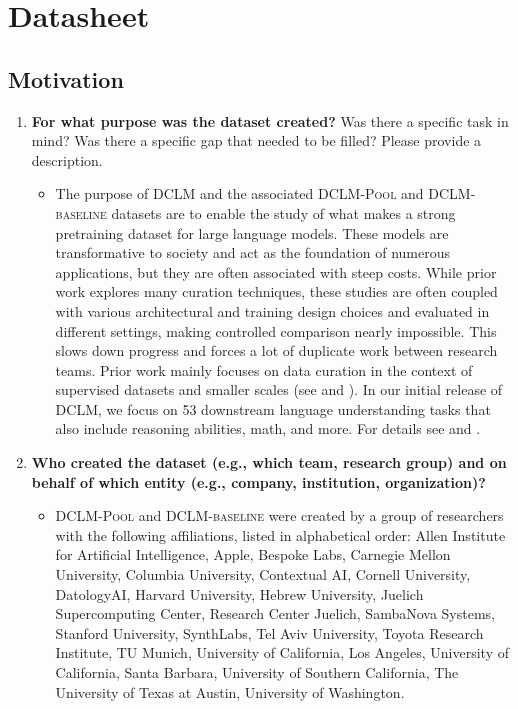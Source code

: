 \documentclass{article}
\newcommand{\dclm}{\textsc{DCLM}\xspace}
\newcommand{\rawpool}{\textsc{DCLM-Pool}\xspace}
\newcommand{\hqpool}{\textsc{DCLM-baseline}\xspace}
\begin{document}
\section{Datasheet}\label{appx:datasheet}

\subsection{Motivation}

\begin{enumerate}[label=Q\arabic*]

\item \textbf{For what purpose was the dataset created?} Was there a specific task in mind? Was there a specific gap that needed to be filled? Please provide a description.

\begin{itemize}
\item The purpose of \dclm and the associated \rawpool and \hqpool datasets are to enable the study of what makes a strong pretraining dataset for large language models. These models are transformative to society and act as the foundation of numerous applications, but they are often associated with steep costs.
While prior work explores many curation techniques, these studies are often coupled with various architectural and training design choices and evaluated in different settings, making controlled comparison nearly impossible.
This slows down progress and forces a lot of duplicate work between research teams. Prior work mainly focuses on data curation in the context of supervised datasets and smaller scales (see  and ).
In our initial release of \dclm, we focus on 53 downstream language understanding tasks that also include reasoning abilities, math, and more. For details see  and .

\end{itemize}

\item \textbf{Who created the dataset (e.g., which team, research group) and on behalf of which entity (e.g., company, institution, organization)?}

\begin{itemize}
\item \rawpool and \hqpool were created by a group of researchers with the following affiliations, listed in alphabetical order: Allen Institute for Artificial Intelligence, Apple, Bespoke Labs, Carnegie Mellon University, Columbia University, Contextual AI, Cornell University, DatologyAI, Harvard University, Hebrew University, Juelich Supercomputing Center, Research Center Juelich, SambaNova Systems, Stanford University, SynthLabs, Tel Aviv University, Toyota Research Institute, TU Munich, University of California, Los Angeles, University of California, Santa Barbara, University of Southern California, The University of Texas at Austin, University of Washington.
\end{itemize}


\end{enumerate}
\end{document}
